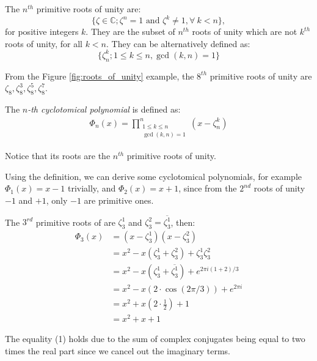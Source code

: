 \begin{definition}\cite{brilliant}
The $n^{th}$ primitive roots of unity are:
$$\{\zeta \in \mathbb C;\zeta^n=1\text{ and }\zeta^k\neq1,\forall ~ k<n \},$$
for positive integers $k$. They are the subset of $n^{th}$ roots of unity which are not $k^{th}$ roots of unity, for all $k<n$. They can be alternatively defined as:
$$\{\zeta_n^k;1\leq k \leq n,\gcd(k,n)=1\}$$
\end{definition}
From the Figure \ref{fig:roots_of_unity} example, the $8^{th}$ primitive roots of unity are $\zeta_8,\zeta_8^3,\zeta_8^5,\zeta_8^7$.

\begin{definition} \label{def:cyclo}The \textit{$n$-th cyclotomical polynomial} is defined as:
\begin{align*}
    \Phi_n(x) = \prod_{\substack{1\leq k \leq n\\ \gcd(k,n)=1}}^{n}(x-\zeta_n^k)
\end{align*}
\end{definition}

Notice that its roots are the $n^{th}$ primitive roots of unity.

Using the definition, we can derive some cyclotomical polynomials, for example $\Phi_1(x)=x-1$ trivially, and $\Phi_2(x)=x+1$, since from the $2^{nd}$ roots of unity $-1$ and $+1$, only $-1$ are primitive ones.

The $3^{rd}$ primitive roots of are $\zeta_3^1$ and $\zeta_3^2=\overline{\zeta_3^1}$, then:
\begin{align}
    \Phi_3(x)&=(x-\zeta_3^1)(x-\zeta_3^2)\nonumber\\
    &=x^2-x(\zeta_3^1+\zeta_3^2)+\zeta_3^1\zeta_3^2\nonumber\\
    &=x^2-x(\zeta_3^1+\overline{\zeta_3^1})+e^{2\pi i(1+2)/3}\label{eq:zeta3}\nonumber\\
    &=x^2-x(2\cdot\cos(2\pi/3))+e^{2\pi i}\\
    &=x^2+x\left(2\cdot \frac12\right)+1\nonumber\\
    &=x^2+x+1\nonumber
\end{align}

The equality (1) holds due to the sum of complex conjugates being equal to two times the real part since we cancel out the imaginary terms.

